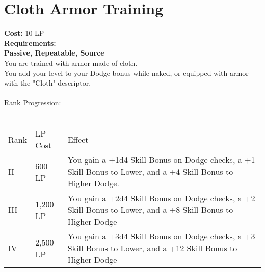 \section{Cloth Armor Training}\label{perk:clothArmorTraining}
\textbf{Cost:} 10 LP\\
\textbf{Requirements:} -\\
\textbf{Passive, Repeatable, Source}\\
You are trained with armor made of cloth.\\
You add your level to your Dodge bonus while naked, or equipped with armor with the "Cloth" descriptor.\\
\\

Rank Progression:\\
\\
\begin{longtable}{l | l | p{9cm}}
	Rank & LP Cost & Effect\\
	II & 600 LP & You gain a +1d4 Skill Bonus on Dodge checks, a +1 Skill Bonus to Lower, and a +4 Skill Bonus to Higher Dodge.\\
	III & 1,200 LP & You gain a +2d4 Skill Bonus on Dodge checks, a +2 Skill Bonus to Lower, and a +8 Skill Bonus to Higher Dodge\\
	IV & 2,500 LP & You gain a +3d4 Skill Bonus on Dodge checks, a +3 Skill Bonus to Lower, and a +12 Skill Bonus to Higher Dodge\\
\end{longtable}